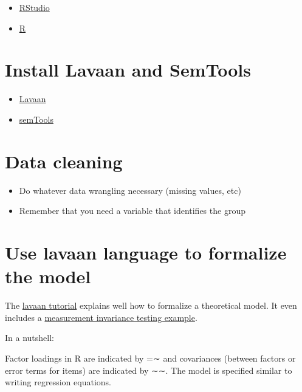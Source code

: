 \documentclass[
]{book}
\providecommand{\tightlist}{%
  \setlength{\itemsep}{0pt}\setlength{\parskip}{0pt}}
\begin{document}
\begin{itemize}
\tightlist
\item
  \href{https://www.rstudio.com/products/rstudio/download/}{RStudio}
\item
  \href{https://cran.r-project.org}{R}
\end{itemize}

\hypertarget{install-lavaan-and-semtools}{%
\section{Install Lavaan and SemTools}\label{install-lavaan-and-semtools}}

\begin{itemize}
\tightlist
\item
  \href{https://cran.r-project.org/web/packages/lavaan/index.html}{Lavaan}
\item
  \href{https://cran.r-project.org/web/packages/semTools/index.html}{semTools}
\end{itemize}

\hypertarget{data-cleaning}{%
\section{Data cleaning}\label{data-cleaning}}

\begin{itemize}
\item
  Do whatever data wrangling necessary (missing values, etc)
\item
  Remember that you need a variable that identifies the group
\end{itemize}

\hypertarget{use-lavaan-language-to-formalize-the-model}{%
\section{Use lavaan language to formalize the model}\label{use-lavaan-language-to-formalize-the-model}}

The \href{https://lavaan.ugent.be/tutorial/}{lavaan tutorial} explains well how to formalize a theoretical model. It even includes a \href{https://lavaan.ugent.be/tutorial/groups.html}{measurement invariance testing example}.

In a nutshell:

Factor loadings in R are indicated by =∼ and covariances (between factors or error terms for items) are indicated by ∼∼. The model is specified similar to writing regression equations.
\end{document}
